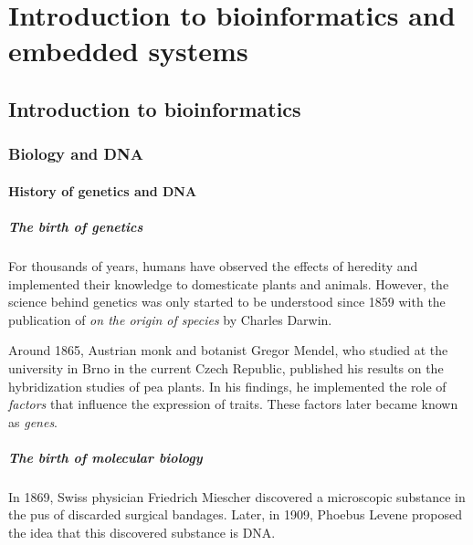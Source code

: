 
\chapter{Introduction to bioinformatics and embedded systems}

\section{Introduction to bioinformatics}

\subsection{Biology and DNA}

\subsubsection{History of genetics and DNA}

\paragraph{The birth of genetics}

For thousands of years, humans have observed the effects of heredity and implemented their knowledge to domesticate plants and animals. However, the science behind genetics was only started to be understood since 1859 with the publication of \emph{on the origin of species} by Charles Darwin. 

Around 1865, Austrian monk and botanist Gregor Mendel, who studied at the university in Brno in the current Czech Republic, published his results on the hybridization studies of pea plants. In his findings, he implemented the role of \emph{factors} that influence the expression of traits. These factors later became known as \emph{genes}.

\paragraph{The birth of molecular biology}

In 1869, Swiss physician Friedrich Miescher discovered a microscopic substance in the pus of discarded surgical bandages. Later, in 1909, Phoebus Levene proposed the idea that this discovered substance is DNA.


